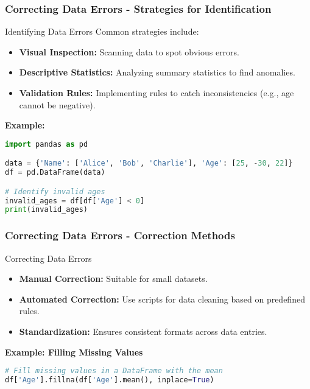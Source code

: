 \documentclass[aspectratio=169]{beamer}
\begin{document}
\begin{frame}[fragile]
    \frametitle{Correcting Data Errors - Strategies for Identification}
    \begin{block}{Identifying Data Errors}
        Common strategies include:
        \begin{itemize}
            \item \textbf{Visual Inspection:} Scanning data to spot obvious errors.
            \item \textbf{Descriptive Statistics:} Analyzing summary statistics to find anomalies.
            \item \textbf{Validation Rules:} Implementing rules to catch inconsistencies (e.g., age cannot be negative).
        \end{itemize}
        \textbf{Example:} 
        \begin{lstlisting}[language=Python]
import pandas as pd

data = {'Name': ['Alice', 'Bob', 'Charlie'], 'Age': [25, -30, 22]}
df = pd.DataFrame(data)

# Identify invalid ages
invalid_ages = df[df['Age'] < 0]
print(invalid_ages)
        \end{lstlisting}
    \end{block}
\end{frame}

\begin{frame}[fragile]
    \frametitle{Correcting Data Errors - Correction Methods}
    \begin{block}{Correcting Data Errors}
        \begin{itemize}
            \item \textbf{Manual Correction:} Suitable for small datasets.
            \item \textbf{Automated Correction:} Use scripts for data cleaning based on predefined rules.
            \item \textbf{Standardization:} Ensures consistent formats across data entries.
        \end{itemize}
        \textbf{Example: Filling Missing Values}
        \begin{lstlisting}[language=Python]
# Fill missing values in a DataFrame with the mean
df['Age'].fillna(df['Age'].mean(), inplace=True)
        \end{lstlisting}
    \end{block}
\end{frame}
\end{document}
